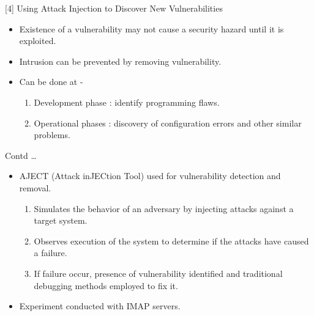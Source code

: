 \documentclass[xcolor=x11names,compress]{beamer}
\renewcommand{\(}{\begin{columns}}
\renewcommand{\)}{\end{columns}}
\newcommand{\<}[1]{\begin{column}{#1}}
\renewcommand{\>}{\end{column}}
\begin{document}
\begin{frame}{[4] Using Attack Injection
		to Discover New Vulnerabilities}
	\begin{itemize}
		\item Existence
		of a vulnerability may not cause a security hazard until it is exploited.
		\item Intrusion can be prevented by removing vulnerability.
		\item Can be done at -
		\begin{enumerate}
			\item Development phase : identify programming flaws. 
			\item Operational phases : discovery of configuration errors and other similar problems.
		\end{enumerate} 
	\end{itemize}
\end{frame}
\begin{frame}{Contd \dots}

	\begin{itemize}

		\item  AJECT (Attack inJECtion Tool) used for
		vulnerability detection and removal.
		\newline
		\begin{enumerate}
			\item Simulates the behavior of an adversary by injecting attacks against a target system.
			\newline
			\item  Observes execution of the system to determine
			if the attacks have caused a failure.
			\newline
			\item If failure occur, presence of vulnerability identified and traditional debugging methods employed to fix it.
			\newline
		\end{enumerate}
		\item Experiment conducted with IMAP servers.
	\end{itemize}
\end{frame}
\end{document}
